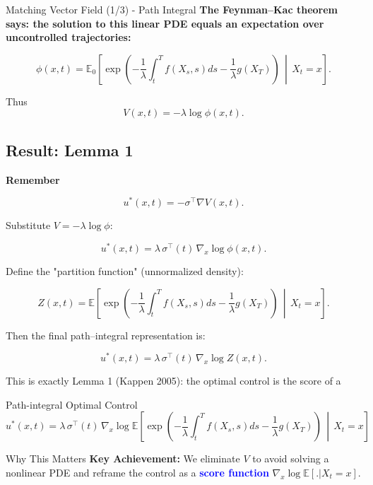 \documentclass[aspectratio=169,xcolor=dvipsnames]{beamer}
\begin{document}
\begin{frame}[allowframebreaks]{Matching Vector Field (1/3) - Path Integral}
    \textbf{The Feynman–Kac theorem says: the solution to this linear PDE equals an expectation over uncontrolled trajectories:}

    $$\phi(x,t) = \mathbb{E}_0\left[\exp\left(-\frac{1}{\lambda}\int_t^T f(X_s,s) ds - \frac{1}{\lambda} g(X_T)\right) \,\middle|\, X_t = x\right].$$

    Thus
    $$V(x,t) = -\lambda \log \phi(x,t).$$

    \vspace{0.8cm}
    

    \subsection*{Result: Lemma 1}
    
    \textbf{Remember}

    $$u^*(x,t) = -\sigma^\top \nabla V(x,t).$$

    Substitute $V = -\lambda \log \phi$:

    $$u^*(x,t) = \lambda \, \sigma^\top(t) \, \nabla_x \log \phi(x,t).$$

    \vspace{2.0cm}
    Define the "partition function" (unnormalized density):

    $$Z(x,t) = \mathbb{E}\left[\exp\left(-\frac{1}{\lambda}\int_t^T f(X_s,s) ds - \frac{1}{\lambda} g(X_T)\right) \,\middle|\, X_t = x\right].$$

    Then the final path–integral representation is:

    $$u^*(x,t) = \lambda \, \sigma^\top(t) \, \nabla_x \log Z(x,t).$$

    This is exactly Lemma 1 (Kappen 2005): the optimal control is the score of a

    \begin{alertblock}{Path-integral Optimal Control}
        $$u^*(x,t) = \lambda \, \sigma^\top(t) \, \nabla_x \log \mathbb{E}\left[\exp\left(-\frac{1}{\lambda}\int_t^T f(X_s,s) ds - \frac{1}{\lambda} g(X_T)\right) \,\middle|\, X_t = x\right]$$
    \end{alertblock}
    

    \begin{block}{Why This Matters}
        \textbf{Key Achievement:} We eliminate $V$ to avoid solving a nonlinear PDE and reframe the control as a \textcolor{blue}{\textbf{score function}} $\nabla_x \log \mathbb{E}[ . | X_t = x]$.


\end{block}
\end{frame}
\end{document}
